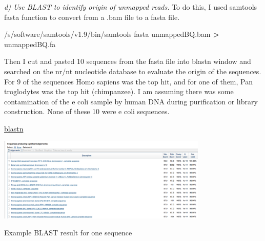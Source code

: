 \documentclass[]{article}
\newenvironment{Shaded}{\begin{snugshade}}{\end{snugshade}}
\newcommand{\OperatorTok}[1]{\textcolor[rgb]{0.81,0.36,0.00}{\textbf{#1}}}
\newcommand{\ExtensionTok}[1]{#1}
\newcommand{\NormalTok}[1]{#1}
\begin{document}
\emph{d) Use BLAST to identify origin of unmapped reads.} To do this, I
used samtools fasta function to convert from a .bam file to a fasta
file.

\begin{Shaded}
\begin{Highlighting}[]
\ExtensionTok{/s/software/samtools/v1.9/bin/samtools}\NormalTok{ fasta unmappedBQ.bam }\OperatorTok{>}\NormalTok{ unmappedBQ.fa}
\end{Highlighting}
\end{Shaded}

Then I cut and pasted 10 sequences from the fasta file into blastn
window and searched on the nr/nt nucleotide database to evaluate the
origin of the sequences. For 9 of the sequences Homo sapiens was the top
hit, and for one of them, Pan troglodytes was the top hit (chimpanzee).
I am assuming there was some contamination of the e coli sample by human
DNA during purification or library construction. None of these 10 were e
coli sequences.

\href{https://blast.ncbi.nlm.nih.gov}{blastn}

\includegraphics[width=0.75000\textwidth]{blast.png}

Example BLAST result for one sequence
\end{document}
